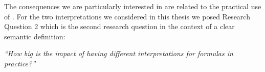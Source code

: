 
The consequences we are particularly interested in are related to the practical use of \nthree.
For the two interpretations we considered in this thesis we posed Research Question 2
which is the second research question in the context of a clear semantic definition:


\emph{``How big is the impact of having different interpretations for \nthree formulas in practice?''}

